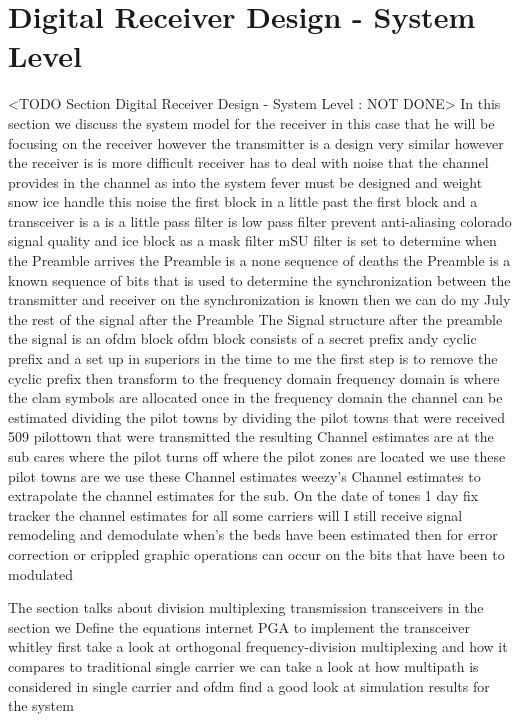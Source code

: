 \section{Digital Receiver Design - System Level}
	<TODO Section Digital Receiver Design - System Level : NOT DONE>
In this section we discuss the system model for the receiver in this case that he will be focusing on the receiver however the transmitter is a design very similar however the receiver is is more difficult receiver has to deal with noise that the channel provides in the channel as into the system fever must be designed and weight snow ice handle this noise the first block in a little past the first block and a transceiver is a is a little pass filter is low pass filter prevent anti-aliasing colorado signal quality and ice block as a mask filter mSU filter is set to determine when the Preamble arrives the Preamble is a none sequence of deaths the Preamble is a known sequence of bits that is used to determine the synchronization between the transmitter and receiver on the synchronization is known then we can do my July the rest of the signal after the Preamble The Signal structure after the preamble the signal is an ofdm block ofdm block consists of a secret prefix andy cyclic prefix and a set up in superiors in the time to me the first step is to remove the cyclic prefix then transform to the frequency domain frequency domain is where the clam symbols are allocated once in the frequency domain the channel can be estimated dividing the pilot towns by dividing the pilot towns that were received 509 pilottown that were transmitted the resulting Channel estimates are at the sub cares where the pilot turns off where the pilot zones are located we use these pilot towns are we use these Channel estimates weezy's Channel estimates to extrapolate the channel estimates for the sub. On the date of tones 1 day fix tracker the channel estimates for all some carriers will I still receive signal remodeling and demodulate when's the beds have been estimated then for error correction or crippled graphic operations can occur on the bits that have been to modulated

The section talks about division multiplexing transmission transceivers in the section we Define the equations internet PGA to implement the transceiver whitley first take a look at orthogonal frequency-division multiplexing and how it compares to traditional single carrier we can take a look at how multipath is considered in single carrier and ofdm find a good look at simulation results for the system

